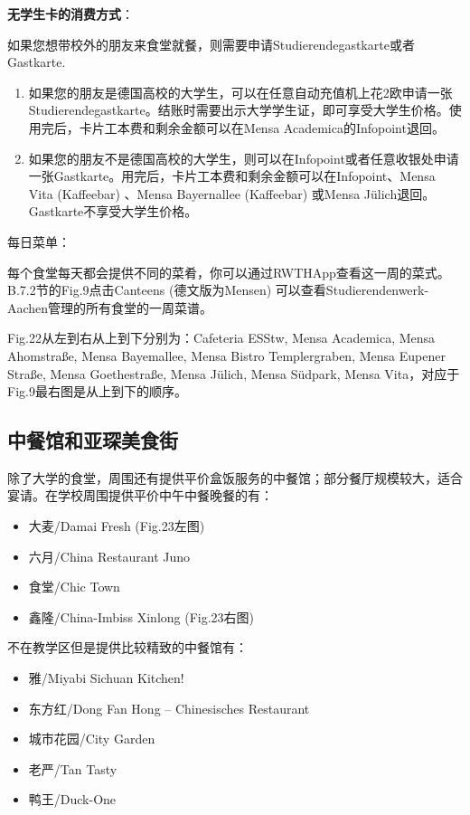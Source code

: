     \textbf{无学生卡的消费方式}：

    如果您想带校外的朋友来食堂就餐，则需要申请Studierendegastkarte或者Gastkarte. 

    \begin{enumerate}
      \item 如果您的朋友是德国高校的大学生，可以在任意自动充值机上花2欧申请一张Studierendegastkarte。结账时需要出示大学学生证，即可享受大学生价格。使用完后，卡片工本费和剩余金额可以在Mensa Academica的Infopoint退回。
      \item 如果您的朋友不是德国高校的大学生，则可以在Infopoint或者任意收银处申请一张Gastkarte。用完后，卡片工本费和剩余金额可以在Infopoint、Mensa Vita (Kaffeebar) 、Mensa Bayernallee (Kaffeebar) 或Mensa Jülich退回。Gastkarte不享受大学生价格。
    \end{enumerate}
    
    每日菜单：

    每个食堂每天都会提供不同的菜肴，你可以通过RWTHApp查看这一周的菜式。B.7.2节的Fig.9点击Canteens (德文版为Mensen) 可以查看Studierendenwerk-Aachen管理的所有食堂的一周菜谱。

    Fig.22从左到右从上到下分别为：Cafeteria ESStw, Mensa Academica, Mensa Ahomstraße, Mensa Bayemallee, Mensa Bistro Templergraben, Mensa Eupener Straße, Mensa Goethestraße, Mensa Jülich, Mensa Südpark, Mensa Vita，对应于Fig.9最右图是从上到下的顺序。

  \subsection{中餐馆和亚琛美食街}

    除了大学的食堂，周围还有提供平价盒饭服务的中餐馆；部分餐厅规模较大，适合宴请。在学校周围提供平价中午中餐晚餐的有：

    \begin{itemize}
      \item 大麦/Damai Fresh (Fig.23左图)
      \item 六月/China Restaurant Juno
      \item 食堂/Chic Town
      \item 鑫隆/China-Imbiss Xinlong (Fig.23右图)
    \end{itemize}

    不在教学区但是提供比较精致的中餐馆有：

    \begin{itemize}
      \item 雅/Miyabi Sichuan Kitchen! 
      \item 东方红/Dong Fan Hong – Chinesisches Restaurant
      \item 城市花园/City Garden
      \item 老严/Tan Tasty
      \item 鸭王/Duck-One
    \end{itemize}

